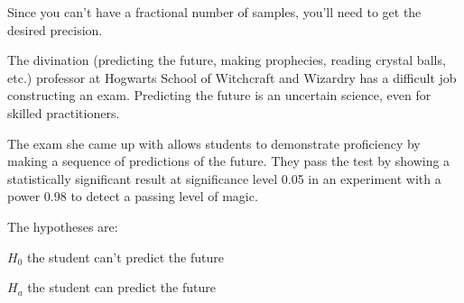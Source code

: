 \documentclass[landscape]{exam}
\begin{document}
\begin{questions}
\begin{solution}
      Since you can't have a fractional number of samples, you'll need 
       to get the desired precision.

    \end{solution}

    \question{} The divination (predicting the future, making prophecies,
    reading crystal balls, etc.) professor at Hogwarts School of Witchcraft
    and Wizardry has a difficult job constructing an exam. Predicting
    the future is an uncertain science, even for skilled practitioners.

    The exam she came up with allows students to demonstrate proficiency by
    making a sequence of predictions of the future. They pass the test by
    showing a statistically significant result at significance level 0.05 
    in an experiment with a power 0.98 to detect a passing level of magic.

    \begin{solution}
      The hypotheses are:
      \begin{itemize*}
        \item $H_0$ the student can't predict the future
        \item $H_a$ the student can predict the future
      \end{itemize*}
    \end{solution}


  \end{questions}
\end{document}
